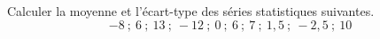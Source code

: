 \begin{exo}
	Calculer la moyenne et l'écart-type des séries statistiques suivantes.
	\[
		-8 \ ; \ 6 \ ; \ 13 \ ; \ -12 \ ; \ 0 \ ; \ 6 \ ; \ 7 \ ; \ 1,5 \ ; \ -2,5 \ ; \ 10
	\]
\end{exo}

